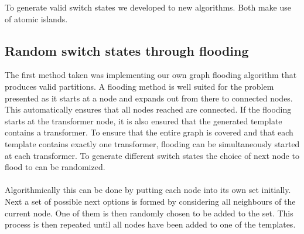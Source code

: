 To generate valid switch states we developed to new algorithms. Both make
use of atomic islands.

\subsection{Random switch states through flooding}

The first method taken was implementing our own graph flooding algorithm that
produces valid partitions. A flooding method is well suited for the problem presented
as it starts at a node and expands out from there to connected nodes. This automatically
ensures that all nodes reached are connected. If the flooding starts at the 
transformer node, it is also ensured that the generated template contains a
transformer. To ensure that the entire graph is covered and that each template contains
exactly one transformer, flooding can be simultaneously started at each transformer.
To generate different switch states the choice of next node to flood to can be
randomized.\\
\\
Algorithmically this can be done by putting each node into its
own set initially.
Next a set of possible next options is formed by considering all neighbours of the
current node. One of them is then randomly chosen to be added to the set.
This process is then repeated until
all nodes have been added to one of the templates. 

